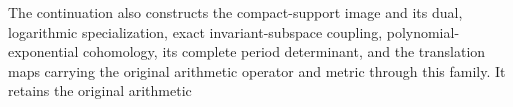 The continuation also constructs the compact-support image and its dual,
logarithmic specialization, exact invariant-subspace coupling,
polynomial-exponential cohomology, its complete period determinant,
and the translation maps carrying the original arithmetic operator
and metric through this family.
It retains the original arithmetic